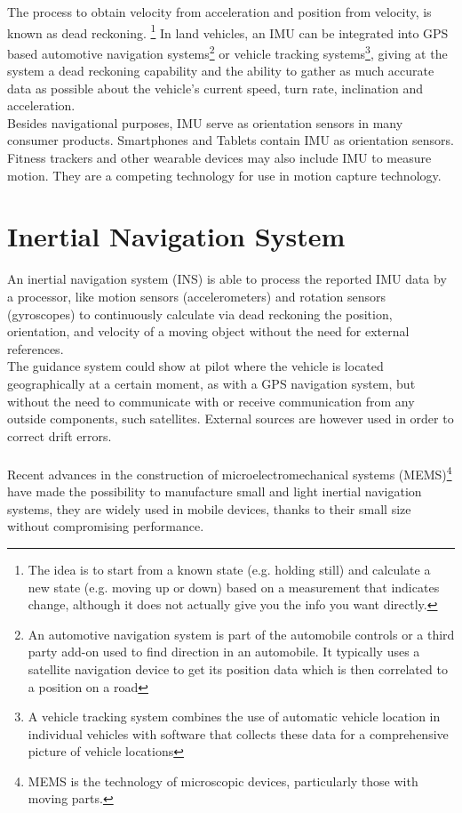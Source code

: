 \documentclass{standalone}
\begin{document}
The process to obtain velocity from acceleration and position from velocity, is known as dead reckoning. \footnote{The idea is to start from a known state (e.g. holding still) and calculate a new state (e.g. moving up or down) based on a measurement that indicates change, although it does not actually give you the info you want directly.}
In land vehicles, an IMU can be integrated into GPS based automotive navigation systems\footnote{An automotive navigation system is part of the automobile controls or a third party add-on used to find direction in an automobile. It typically uses a satellite navigation device to get its position data which is then correlated to a position on a road} or vehicle tracking systems\footnote{A vehicle tracking system combines the use of automatic vehicle location in individual vehicles with software that collects these data for a comprehensive picture of vehicle locations}, giving at the system a dead reckoning capability and the ability to gather as much accurate data as possible about the vehicle's current speed, turn rate, inclination and acceleration. \\
Besides navigational purposes, IMU serve as orientation sensors in many consumer products. Smartphones and Tablets contain IMU as orientation sensors. Fitness trackers and other wearable devices may also include IMU to measure motion.  They are a competing technology for use in motion capture technology\cite{motioncapture}.\clearpage
\section{Inertial Navigation System}\label{Inertial Navigation System}
An inertial navigation system (INS) is able to process the reported IMU data by a processor, like motion sensors (accelerometers) and rotation sensors (gyroscopes) to continuously calculate via dead reckoning the position, orientation, and velocity of a moving object without the need for external references\cite{basicprincipleaereo}.\\ 
The guidance system could show at pilot where the vehicle is located geographically at a certain moment, as with a GPS navigation system, but without the need to communicate with or receive communication from any outside components, such satellites. External sources are however used in order to correct drift errors.\\\\Recent advances in the construction of microelectromechanical systems (MEMS)\footnote{MEMS is the technology of microscopic devices, particularly those with moving parts.} have made the possibility to manufacture small and light inertial navigation systems, they are widely used in mobile devices, thanks to their small size without compromising performance.\\
\end{document}
